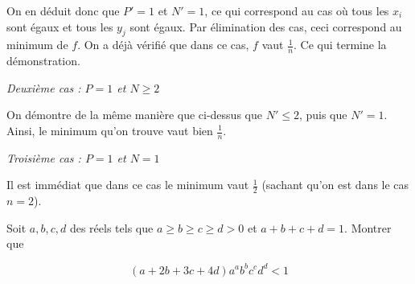\begin{sol}
On en déduit donc que $P'=1$ et $N'=1$, ce qui correspond au cas où tous les $x_i$ sont égaux et tous les $y_j$ sont égaux. Par élimination des cas, ceci correspond au minimum de $f$. On a déjà vérifié que dans ce cas, $f$ vaut $\frac1{n}$. Ce qui termine la démonstration.

\textit{Deuxième cas : $P=1$ et $N \ge 2$}

On démontre de la même manière que ci-dessus que $N' \le 2$, puis que $N'=1$. Ainsi, le minimum qu'on trouve vaut bien $\frac1{n}$.

\textit{Troisième cas : $P=1$ et $N=1$}

Il est immédiat que dans ce cas le minimum vaut $\frac12$ (sachant qu'on est dans le cas $n=2$).
\end{sol}


\begin{exo}[IMO 2020 P2]
Soit $a,b,c,d$ des réels tels que $a\ge b \ge c\ge d >0$ et $a+b+c+d=1$. Montrer que

$$(a+2b+3c+4d)a^ab^bc^cd^d<1$$
\end{exo}


